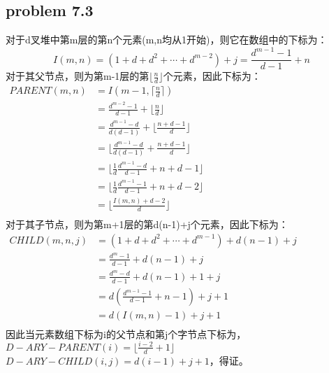 \documentclass[11pt]{ctexart}
\begin{document}
	\subsection*{problem 7.3}
	对于d叉堆中第m层的第n个元素(m,n均从1开始)，则它在数组中的下标为：
	$$I(m,n)=(1+d+d^2+\cdots+d^{m-2})+j=\frac{d^{m-1}-1}{d-1}+n$$
	对于其父节点，则为第m-1层的第$\lfloor\frac{n}{d}\rfloor$个元素，因此下标为：\\
	$
	\begin{aligned}
	PARENT(m,n)&=I(m-1,\lceil\frac{n}{d}\rceil)\\
	&=\frac{d^{m-2}-1}{d-1}+\lfloor\frac{n}{d}\rfloor\\
	&=\frac{d^{m-1}-d}{d(d-1)}+\lfloor\frac{n+d-1}{d}\rfloor\\
	&=\lfloor\frac{d^{m-1}-d}{d(d-1)}+\frac{n+d-1}{d}\rfloor\\
	&=\lfloor\frac{1}{d}\frac{d^{m-1}-d}{d-1}+n+d-1\rfloor\\
	&=\lfloor\frac{1}{d}\frac{d^{m-1}-1}{d-1}+n+d-2\rfloor\\
	&=\lfloor\frac{I(m,n)+d-2}{d}\rfloor\\
	\end{aligned}
	$\\
	对于其子节点，则为第m+1层的第d(n-1)+j个元素，因此下标为：\\
	$
	\begin{aligned}
	CHILD(m,n,j)&=(1+d+d^2+\cdots+d^{m-1})+d(n-1)+j\\
	&=\frac{d^m-1}{d-1}+d(n-1)+j\\
	&=\frac{d^{m}-d}{d-1}+d(n-1)+1+j\\
	&=d(\frac{d^{m-1}-1}{d-1}+n-1)+j+1\\
	&=d(I(m,n)-1)+j+1\\
	\end{aligned}
	$\\
	因此当元素数组下标为i的父节点和第j个字节点下标为，\\
	$D-ARY-PARENT(i)=\lfloor\frac{i-2}{d}+1\rfloor$\\
	$D-ARY-CHILD(i,j)=d(i-1)+j+1$，得证。
\end{document}
